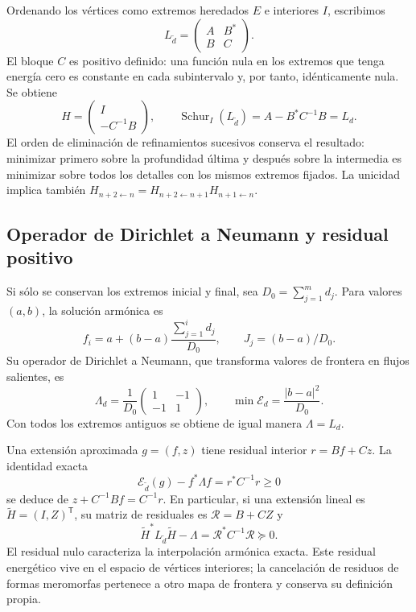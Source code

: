 Ordenando los vértices como extremos heredados \(E\) e interiores \(I\),
escribimos
\[
 L_{\widetilde d}=\begin{pmatrix}A&B^*\\B&C\end{pmatrix}.
\]
El bloque \(C\) es positivo definido: una función nula en los extremos
que tenga energía cero es constante en cada subintervalo y, por tanto,
idénticamente nula. Se obtiene
\begin{equation}
 H=\begin{pmatrix}I\\-C^{-1}B\end{pmatrix},\qquad
 \operatorname{Schur}_{I}(L_{\widetilde d})
 =A-B^*C^{-1}B=L_d.
 \label{eq:schur-intervalar-k}
\end{equation}
El orden de eliminación de refinamientos sucesivos conserva el resultado:
minimizar primero sobre la profundidad última y después sobre la intermedia
es minimizar sobre todos los detalles con los mismos extremos fijados.
La unicidad implica también
\(H_{n+2\leftarrow n}=H_{n+2\leftarrow n+1}H_{n+1\leftarrow n}\).

\subsection{Operador de Dirichlet a Neumann y residual positivo}

Si sólo se conservan los extremos inicial y final, sea
\(D_0=\sum_{j=1}^md_j\). Para valores \((a,b)\), la solución
armónica es
\[
 f_i=a+(b-a)\frac{\sum_{j=1}^id_j}{D_0},\qquad
 J_j=(b-a)/D_0.
\]
Su operador de Dirichlet a Neumann, que transforma valores de frontera en
flujos salientes, es
\begin{equation}
 \Lambda_d=\frac1{D_0}
 \begin{pmatrix}1&-1\\-1&1\end{pmatrix},\qquad
 \min\mathcal E_d=\frac{|b-a|^2}{D_0}.
 \label{eq:dtn-intervalar-k}
\end{equation}
Con todos los extremos antiguos se obtiene de igual manera \(\Lambda=L_d\).

Una extensión aproximada \(g=(f,z)\) tiene residual interior
\(r=Bf+Cz\). La identidad exacta
\begin{equation}
 \mathcal E_{\widetilde d}(g)-f^*\Lambda f
 =r^*C^{-1}r\ge0
 \label{eq:residual-dtn-k}
\end{equation}
se deduce de \(z+C^{-1}Bf=C^{-1}r\). En particular, si una
extensión lineal es \(\widetilde H=(I,Z)^{\mathsf T}\), su matriz de
residuales es \(\mathscr R=B+CZ\) y
\[
 \widetilde H^*L_{\widetilde d}\widetilde H-\Lambda
 =\mathscr R^*C^{-1}\mathscr R\succeq0.
\]
El residual nulo caracteriza la interpolación armónica exacta. Este
residual energético vive en el espacio de vértices interiores; la
cancelación de residuos de formas meromorfas pertenece a otro mapa de
frontera y conserva su definición propia.

